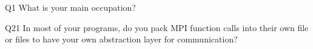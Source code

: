 \begin{description}%
\item{Q1} What is your main occupation?%
\item{Q21} In most of your programs, do you pack MPI function calls into their own file or files to have your own abstraction layer for communication?%
\end{description}%
